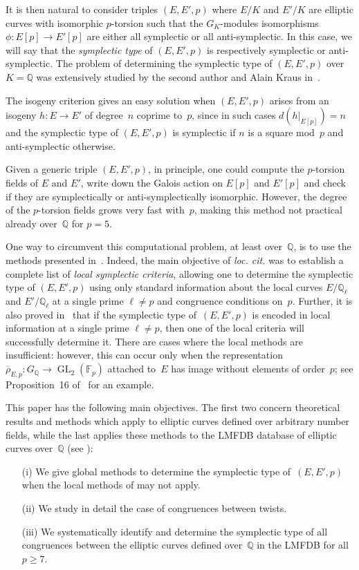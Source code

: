 \documentclass[twoside,leqno,symbols-for-thanks, draft]{rmi}
\numberwithin{equation}{section}
\newcommand{\Fp}{\mathbb{F}_p}
\newcommand{\Q}{\mathbb{Q}}
\newcommand{\rhobar}{{\overline{\rho}}}
\newcommand{\GL}{\operatorname{GL}}
\theoremstyle{remark}
\begin{document}
It is then natural to consider triples $(E,E',p)$ where $E/K$ and
$E'/K$ are elliptic curves with isomorphic $p$-torsion such that the
$G_K$-modules isomorphisms $\phi : E[p] \rightarrow E'[p]$ are either
all symplectic or all anti-symplectic.  In this case, we will say that
the {\em symplectic type} of $(E,E',p)$ is respectively symplectic or
anti-symplectic.  The problem of determining the symplectic type of
$(E,E',p)$ over~$K=\Q$ was extensively studied by the second author
and Alain Kraus in~\cite{FKSym}.

The isogeny criterion gives an easy solution when $(E,E',p)$
arises from an isogeny $h \colon E \to E'$ of degree~$n$ coprime
to~$p$, since in such cases $d(h|_{E[p]}) = n$ and the symplectic type
of $(E,E',p)$ is symplectic if $n$ is a square mod~$p$ and
anti-symplectic otherwise.

Given a generic triple $(E, E', p)$, in principle, one
could compute the $p$-torsion fields of $E$ and $E'$,
write down the Galois action on $E[p]$ and $E'[p]$ and check if they
are symplectically or anti-symplectically isomorphic. However, the
degree of the $p$-torsion fields grows very fast with~$p$, making this
method not practical already over~$\Q$ for $p = 5$.

One way to circumvent this computational problem, at least over~$\Q$, is to use the methods
presented in~\cite{FKSym}. Indeed, the main objective of {\it loc. cit.} was to establish a complete list of {\em local symplectic criteria},
allowing one to determine the symplectic type of $(E,E',p)$ using only
standard information about the local curves $E/\Q_\ell$ and
$E'/\Q_\ell$ at a single prime $\ell \neq p$ and congruence conditions
on~$p$. Further, it is also proved in~\cite{FKSym}  that if the
symplectic type of~$(E,E',p)$ is encoded in local information at a
single prime $\ell \neq p$, then one of the local criteria will
successfully determine it.  
There are cases where the local methods
are insufficient: however, this can occur only when 
the representation~$\rhobar_{E,p} : G_\Q \to \GL_2(\Fp)$ attached to~$E$ 
has image without elements of order~$p$;
see Proposition~16 of~\cite{FKSym} for an example.

This paper has the following main objectives. The first two concern
theoretical results and methods which apply to elliptic curves defined
over arbitrary number fields, while the last applies these methods to
the LMFDB database of elliptic curves over~$\Q$ (see \cite{lmfdb}):
\begin{itemize}
 \item[(i)] We give global methods to determine the symplectic type
   of~$(E,E',p)$ when the local methods of \cite{FKSym} may not apply.
 \item[(ii)] We study in detail the case of congruences between twists.
\item[(iii)] We systematically identify and determine the symplectic
  type of all congruences between the elliptic curves defined
  over~$\Q$ in the LMFDB for all~$p\ge7$.
\end{itemize}
\end{document}
